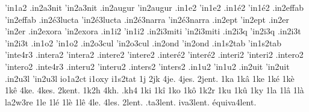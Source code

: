 {                    'in1a2
                    .in2a3nit
                    'in2a3nit
                    .in2augur
                    'in2augur
                    .in1e2
                    'in1e2
                    .in1é2
                    'in1é2
                    .in2effab %
                    'in2effab
                    .in2é3lucta
                    'in2é3lucta
                    .in2é3narra
                    'in2é3narra
                    .in2ept
                    'in2ept
                    .in2er
                    'in2er
                    .in2exora %
                    'in2exora
                    .in1i2
                    'in1i2
                    .in2i3miti
                    'in2i3miti
                    .in2i3q
                    'in2i3q
                    .in2i3t
                    'in2i3t
                    .in1o2
                    'in1o2
                    .in2o3cul
                    'in2o3cul
                    .in2ond
                    'in2ond
                    .in1s2tab
                    'in1s2tab
                    'inte4r3
                    .intera2
                    'intera2
                    .intere2
                    'intere2
                    .interé2
                    'interé2
                    .interi2
                    'interi2
                    .intero2
                    'intero2
                    .inte4r3
                    .interu2
                    'interu2
                    .inters2
                    'inters2
                    .in1u2
                    'in1u2
                    .in2uit
                    'in2uit
                    .in2u3l
                    'in2u3l
                    io1a2ct
                    i1oxy
                    i1s2tat
1j
2jk
4je.
4jes.
2jent. %
1ka
1kâ
1ke
1ké
1kè
1kê
4ke.
4kes.
2kent. %
1k2h
4kh.
.kh4
1ki
1kî
1ko
1kô
1k2r
1ku
1kû
1ky
1la
1lâ
1là
                    la2w3re
1le
1lé
1lè
1lê
4le.
4les.
      2lent.
   .ta3lent.
   iva3lent.
équiva4lent.
}
